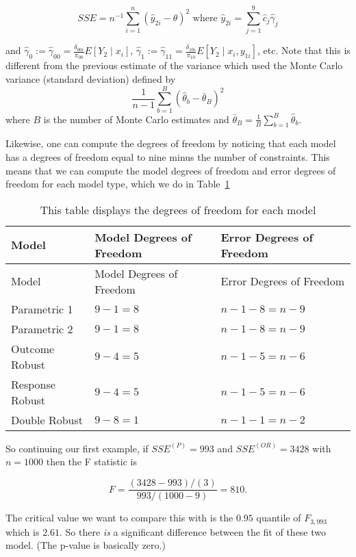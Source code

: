 \documentclass[
  12pt]{simple-article}%
\begin{document}
\[ SSE = n^{-1} \sum_{i = 1}^n (\hat y_{2i} - \theta)^2 \text{ where }
\hat y_{2i} = \sum_{j = 1}^9 \hat c_j \hat \gamma_j \]

and
\(\hat \gamma_0 := \hat \gamma_{00} = \frac{\delta_{00i}}{\pi_{00}} E[Y_2 \mid x_i]\),
\(\hat \gamma_1 := \hat \gamma_{11} = \frac{\delta_{10i}}{\pi_{10}} E[Y_2 \mid x_i, y_{1i}]\),
etc. Note that this is different from the previous estimate of the
variance which used the Monte Carlo variance (standard deviation)
defined by
\[ \frac{1}{n - 1} \sum_{b = 1}^B (\hat \theta_b - \bar \theta_B)^2 \]
where \(B\) is the number of Monte Carlo estimates and
\(\bar \theta_B = \frac{1}{B} \sum_{b = 1}^B \hat \theta_b\).

Likewise, one can compute the degrees of freedom by noticing that each
model has a degrees of freedom equal to nine minus the number of
constraints. This means that we can compute the model degrees of freedom
and error degrees of freedom for each model type, which we do in
Table~\ref{tbl-df}

\hypertarget{tbl-df}{}
\begin{longtable}[]{@{}lll@{}}
\caption{\label{tbl-df}This table displays the degrees of freedom for
each model}\tabularnewline
\toprule\noalign{}
Model & Model Degrees of Freedom & Error Degrees of Freedom \\
\midrule\noalign{}
\endfirsthead
\toprule\noalign{}
Model & Model Degrees of Freedom & Error Degrees of Freedom \\
\midrule\noalign{}
\endhead
\bottomrule\noalign{}
\endlastfoot
Parametric 1 & \(9 - 1 = 8\) & \(n - 1 - 8 = n - 9\) \\
Parametric 2 & \(9 - 1 = 8\) & \(n - 1 - 8 = n - 9\) \\
Outcome Robust & \(9 - 4 = 5\) & \(n - 1 - 5 = n - 6\) \\
Response Robust & \(9 - 4 = 5\) & \(n - 1 - 5 = n - 6\) \\
Double Robust & \(9 - 8 = 1\) & \(n - 1 - 1 = n - 2\) \\
\end{longtable}

So continuing our first example, if \(SSE^{(P)} = 993\) and
\(SSE^{(OR)} = 3428\) with \(n = 1000\) then the F statistic is

\[F = \frac{(3428 - 993) / (3)}{993 / (1000 - 9)} = 810.\]

The critical value we want to compare this with is the \(0.95\) quantile
of \(F_{3, 993}\) which is \(2.61\). So there \emph{is} a significant
difference between the fit of these two model. (The p-value is basically
zero.)
\end{document}

